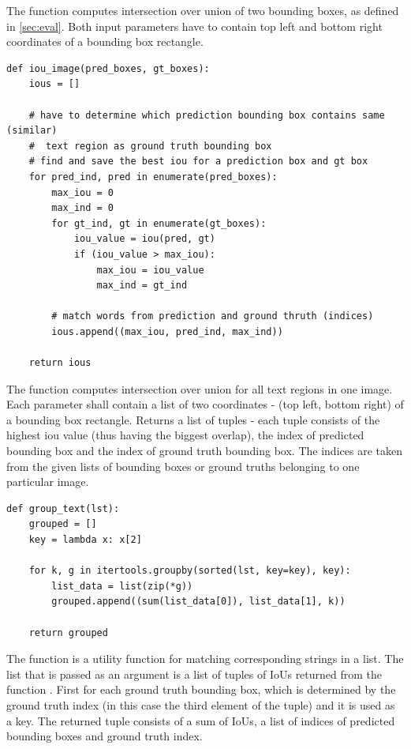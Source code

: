 The function  computes intersection over union of two bounding boxes, as defined in \ref*{sec:eval}. Both input parameters have to contain top left and bottom right coordinates of a bounding box rectangle.

\begin{lstlisting}[caption=iou\_image]
def iou_image(pred_boxes, gt_boxes):
    ious = []

    # have to determine which prediction bounding box contains same (similar) 
    #  text region as ground truth bounding box
    # find and save the best iou for a prediction box and gt box
    for pred_ind, pred in enumerate(pred_boxes):
        max_iou = 0
        max_ind = 0
        for gt_ind, gt in enumerate(gt_boxes):
            iou_value = iou(pred, gt)
            if (iou_value > max_iou):
                max_iou = iou_value
                max_ind = gt_ind

        # match words from prediction and ground thruth (indices)     
        ious.append((max_iou, pred_ind, max_ind))

    return ious

\end{lstlisting}

The function  computes intersection over union for all text regions in one image.
Each parameter shall contain a list of two coordinates - (top left, bottom right) of a bounding box rectangle.
Returns a list of tuples - each tuple consists of the highest iou value (thus having the biggest overlap), the index of predicted bounding box and  the index of ground truth bounding box. The indices are taken from the given lists of bounding boxes or ground truths belonging to one particular image.

\begin{lstlisting}[caption=group\_text]
def group_text(lst):
    grouped = []
    key = lambda x: x[2]

    for k, g in itertools.groupby(sorted(lst, key=key), key):
        list_data = list(zip(*g))
        grouped.append((sum(list_data[0]), list_data[1], k))

    return grouped
\end{lstlisting}

The function  is a utility function for matching corresponding strings in a list. The list that is passed as an argument is a list of tuples of IoUs returned from the function . First for each ground truth bounding box, which is determined by the ground truth index (in this case the third element of the tuple) and it is used as a key. The returned tuple consists of a sum of IoUs, a list of indices of predicted bounding boxes and ground truth index.

